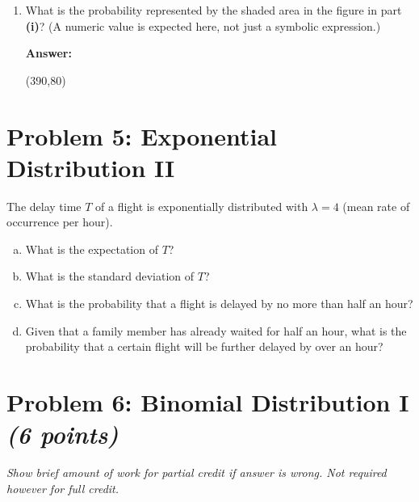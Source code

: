 \documentclass[11pt,twoside]{article}
\newcommand{\pts}[1]{\marginpar{ \small\hspace{0pt} \textit{[#1]} } }
\numberwithin{equation}{section}
\newcommand{\?}{\stackrel{?}{=}}
\newcommand{\la}{\lambda}
\begin{document}
\begin{enumerate}[\bf (a)]
  \bigskip
  \bigskip
  
\item What is the probability represented by the shaded area in the figure in part \textbf{(i)}? \pts{2} (A numeric value
  is expected here, not just a symbolic expression.)

  \vspace{2ex}
    \begin{minipage}[]{.1\linewidth}
    {\bf Answer:}
  \end{minipage}\qquad
  \begin{minipage}[]{.8\linewidth}
    \framebox(390,80){\phantom{\Huge t}   }     
  \end{minipage}

  
    \end{enumerate}
\eject

\section*{Problem 5: Exponential Distribution II }
The delay time $T$ of a flight is exponentially distributed with $\la = 4$ (mean rate of occurrence per hour).


\begin{enumerate}[(a)]
\item What is the expectation of $T$? \pts{1}
  \vspace{10ex}

\item What is the standard deviation of $T$? \pts{1}
  \vspace{10ex}

  
\item What is the probability that a flight is delayed by no more than half an hour? \pts{2}
  \vspace{25ex}
  
\item Given that a family member has already waited for half an hour, \pts{3}
 what is the probability that a certain flight will be further delayed by over an hour?

\end{enumerate}

\eject
\section*{Problem 6: Binomial Distribution I \textit{(6 points)}}

\textit{Show brief amount of work for partial credit if answer is wrong. Not required however for full credit. }
\end{document}
